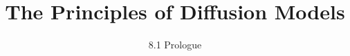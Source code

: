 
\title{The Principles of Diffusion Models}
\subtitle{8.1 Prologue}


\begin{frame}
    \titlepage
\end{frame}


